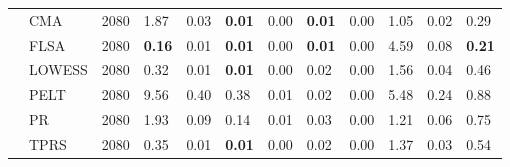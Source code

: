 \begin{table}[ht]
\begin{tabular}{llrlrlrlrlrl}
   & CMA & 2080 & 1.87 & 0.03 & \textbf{0.01} & 0.00 & \textbf{0.01} & 0.00 & 1.05 & 0.02 & 0.29 \\ 
   & FLSA & 2080 & \textbf{0.16} & 0.01 & \textbf{0.01} & 0.00 & \textbf{0.01} & 0.00 & 4.59 & 0.08 & \textbf{0.21} \\ 
   & LOWESS & 2080 & 0.32 & 0.01 & \textbf{0.01} & 0.00 & 0.02 & 0.00 & 1.56 & 0.04 & 0.46 \\ 
   & PELT & 2080 & 9.56 & 0.40 & 0.38 & 0.01 & 0.02 & 0.00 & 5.48 & 0.24 & 0.88 \\ 
   & PR & 2080 & 1.93 & 0.09 & 0.14 & 0.01 & 0.03 & 0.00 & 1.21 & 0.06 & 0.75 \\ 
   & TPRS & 2080 & 0.35 & 0.01 & \textbf{0.01} & 0.00 & 0.02 & 0.00 & 1.37 & 0.03 & 0.54 \\ 
   \bottomrule
\end{tabular}
\end{table}

